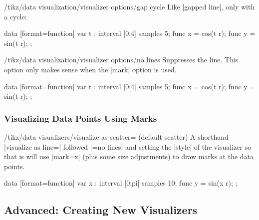 \begin{key}{/tikz/data visualization/visualizer options/gap cycle}
    Like |gapped line|, only with a cycle:
\begin{codeexample}[preamble={\usetikzlibrary{datavisualization.formats.functions}}]
\tikz [scale=.55] \datavisualization
 [scientific axes=clean, all axes={ticks=few},
  visualize as smooth line=my data,  my data={gap cycle}]
data [format=function] {
  var t : interval [0:4] samples 5;
  func x = cos(\value t r);
  func y = sin(\value t r);
};
\end{codeexample}
\end{key}

\begin{key}{/tikz/data visualization/visualizer options/no lines}
    Suppresses the line. This option only makes sense when the |mark| option is
    used.
\begin{codeexample}[preamble={\usetikzlibrary{datavisualization.formats.functions}}]
\tikz [scale=.55] \datavisualization
 [scientific axes=clean, all axes={ticks=few},
  visualize as smooth line=my data,  my data={no lines, style={mark=x}}]
data [format=function] {
  var t : interval [0:4] samples 5;
  func x = cos(\value t r);
  func y = sin(\value t r);
};
\end{codeexample}
\end{key}


\subsubsection{Visualizing Data Points Using Marks}

\begin{key}{/tikz/data visualizers/visualize as scatter= (default scatter)}
    A shorthand  |visualize as line=| followed
    |=no lines| and setting the |style| of the visualizer
    so that is will use |mark=x| (plus some size adjustments) to draw marks at
    the data points.
\begin{codeexample}[
    width=7cm,
    preamble={\usetikzlibrary{datavisualization.formats.functions}},
]
\tikz \datavisualization
 [scientific axes=clean,
  visualize as scatter]
data [format=function] {
  var x : interval [0:pi] samples 10;
  func y = sin(\value x r);
};
\end{codeexample}
\end{key}


\subsection{Advanced: Creating New Visualizers}

